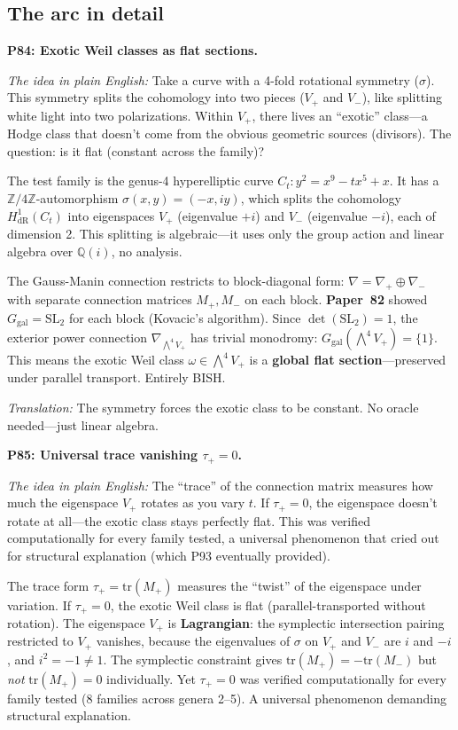 \documentclass[11pt,twoside,openany]{report}
\theoremstyle{remark}
\newcommand{\BISH}{\textsf{BISH}}
\newcommand{\paperref}[1]{\textbf{Paper~#1}}
\begin{document}
\subsection*{The arc in detail}

\textbf{P84: Exotic Weil classes as flat sections.}

\emph{The idea in plain English:} Take a curve with a 4-fold rotational symmetry ($\sigma$). This symmetry splits the cohomology into two pieces ($V_+$ and $V_-$), like splitting white light into two polarizations. Within $V_+$, there lives an ``exotic'' class---a Hodge class that doesn't come from the obvious geometric sources (divisors). The question: is it flat (constant across the family)?

The test family is the genus-4 hyperelliptic curve $C_t: y^2 = x^9 - tx^5 + x$. It has a $\mathbb{Z}/4\mathbb{Z}$-automorphism $\sigma(x,y) = (-x, iy)$, which splits the cohomology $H^1_{\mathrm{dR}}(C_t)$ into eigenspaces $V_+$ (eigenvalue $+i$) and $V_-$ (eigenvalue $-i$), each of dimension 2. This splitting is algebraic---it uses only the group action and linear algebra over $\mathbb{Q}(i)$, no analysis.

The Gauss-Manin connection restricts to block-diagonal form: $\nabla = \nabla_+ \oplus \nabla_-$ with separate connection matrices $M_+, M_-$ on each block. \paperref{82} showed $G_{\mathrm{gal}} = \mathrm{SL}_2$ for each block (Kovacic's algorithm). Since $\det(\mathrm{SL}_2) = 1$, the exterior power connection $\nabla_{\bigwedge^4 V_+}$ has trivial monodromy: $G_{\mathrm{gal}}(\bigwedge^4 V_+) = \{1\}$. This means the exotic Weil class $\omega \in \bigwedge^4 V_+$ is a \textbf{global flat section}---preserved under parallel transport. Entirely \BISH.

\emph{Translation:} The symmetry forces the exotic class to be constant. No oracle needed---just linear algebra.

\textbf{P85: Universal trace vanishing $\tau_+ = 0$.}

\emph{The idea in plain English:} The ``trace'' of the connection matrix measures how much the eigenspace $V_+$ rotates as you vary $t$. If $\tau_+ = 0$, the eigenspace doesn't rotate at all---the exotic class stays perfectly flat. This was verified computationally for every family tested, a universal phenomenon that cried out for structural explanation (which P93 eventually provided).

The trace form $\tau_+ = \mathrm{tr}(M_+)$ measures the ``twist'' of the eigenspace under variation. If $\tau_+ = 0$, the exotic Weil class is flat (parallel-transported without rotation). The eigenspace $V_+$ is \textbf{Lagrangian}: the symplectic intersection pairing restricted to $V_+$ vanishes, because the eigenvalues of $\sigma$ on $V_+$ and $V_-$ are $i$ and $-i$, and $i^2 = -1 \neq 1$. The symplectic constraint gives $\mathrm{tr}(M_+) = -\mathrm{tr}(M_-)$ but \emph{not} $\mathrm{tr}(M_+) = 0$ individually. Yet $\tau_+ = 0$ was verified computationally for every family tested (8 families across genera 2--5). A universal phenomenon demanding structural explanation.
\end{document}
